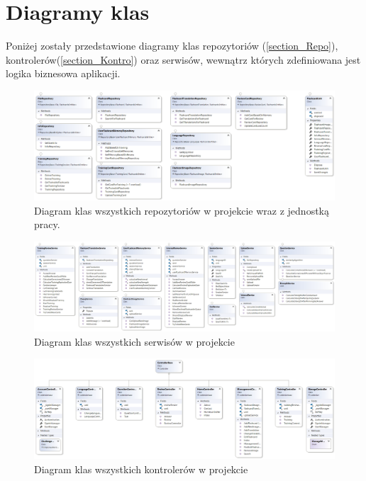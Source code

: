 \section{Diagramy klas}

Poniżej zostały przedstawione diagramy klas repozytoriów (\ref{section_Repo}), kontrolerów(\ref{section_Kontro}) oraz serwisów, wewnątrz których zdefiniowana jest logika biznesowa aplikacji.

\begin{figure}[h]
	\centering
	\includegraphics[width=\textwidth]{images/Repos.png}
	 \caption{Diagram klas wszystkich repozytoriów w projekcie wraz z jednostką pracy.}
\end{figure}


\begin{figure}
	\centering
	\includegraphics[width=\textwidth]{images/Serwisy.png}
	 \caption{Diagram klas wszystkich serwisów w projekcie}
\end{figure}


\begin{figure}
	\centering
	\includegraphics[width=\textwidth]{images/Controllers.png}
	 \caption{Diagram klas wszystkich kontrolerów w projekcie}
\end{figure}


